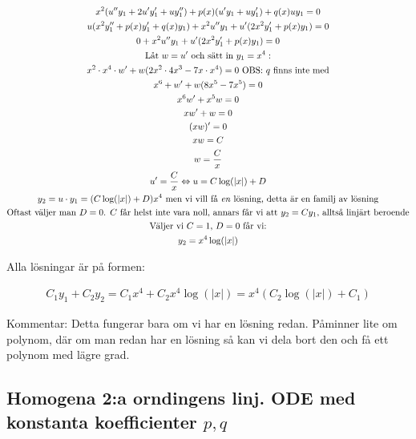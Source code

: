 \begin{equation*}
  \begin{gathered}
    x^2(u^{\prime\prime}y_1+2u^{\prime}y_{1}^{\prime}+uy_{1}^{\prime\prime})+p(x)(u^{\prime}y_1+uy_{1}^{\prime})+q(x)uy_1=0\\
    u(x^2y_{1}^{\prime\prime}+p(x)y_{1}^{\prime}+q(x)y_{1})+x^2u^{\prime\prime}y_1+u^{\prime}(2x^2y_{1}^{\prime}+p(x)y_1)=0\\
    0+x^2u^{\prime\prime}y_1+u^{\prime}(2x^2y_{1}^{\prime}+p(x)y_1)=0\\
    \text{Låt } w = u^{\prime} \text{ och sätt in } y_1=x^4:\\
    x^2\cdot x^4\cdot w^{\prime}+w(2x^2\cdot4x^3-7x\cdot x^4)=0 \text{ OBS: $q$ finns inte med}\\
    x^6+w^{\prime}+w(8x^5-7x^5)=0\\
    x^6w^{\prime}+x^5w=0\\
    xw^{\prime}+w=0\\
    (xw)^{\prime}=0\\
    xw=C\\
    w=\dfrac{C}{x}\\
    u^{\prime}=\dfrac{C}{x}\Leftrightarrow u=C\log(|x|)+D\\
    y_2 = u\cdot y_1 = (C\log(|x|)+D)x^4 \text{ men vi vill få \textit{en} lösning, detta är en familj av lösning}\\
    \text{Oftast väljer man $D=0$. $C$ får helst inte vara noll, annars får vi att $y_2=Cy_1$, alltså linjärt beroende}\\
     \text{Väljer vi $C=1$, $D=0$ får vi:}\\
     y_2=x^4\log(|x|)
  \end{gathered}
\end{equation*}
\par\bigskip
\noindent Alla lösningar är på formen:


\begin{equation*}
  \begin{gathered}
    C_1y_1+C_2y_2=C_1x^4+C_2x^4\log(|x|)=x^4(C_2\log(|x|)+C_1)
  \end{gathered}
\end{equation*}
\par\bigskip
\noindent Kommentar: Detta fungerar bara om vi har en lösning redan. Påminner lite om polynom, där om man redan har en lösning så kan vi dela bort den och få ett polynom med lägre grad.

\subsection{Homogena 2:a orndingens linj. ODE med konstanta koefficienter $p,q$}\hfill\\

